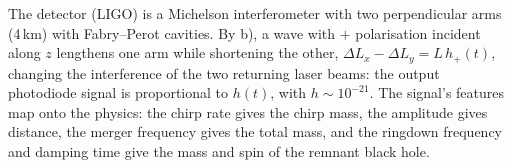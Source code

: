 \documentclass[12pt]{article}
\begin{document}
\begin{enumerate}[label=\alph*)]
\begin{itemize}
\end{itemize}
\begin{center}
\end{center}
The detector (LIGO) is a Michelson interferometer with two perpendicular arms (4\,km) with Fabry--Perot cavities. By b), a wave with $+$ polarisation incident along $z$ lengthens one arm while shortening the other, $\Delta L_x-\Delta L_y=L\,h_+(t)$, changing the interference of the two returning laser beams: the output photodiode signal is proportional to $h(t)$, with $h\sim10^{-21}$. The signal's features map onto the physics: the chirp rate gives the chirp mass, the amplitude gives distance, the merger frequency gives the total mass, and the ringdown frequency and damping time give the mass and spin of the remnant black hole.
\end{enumerate}
\end{document}

